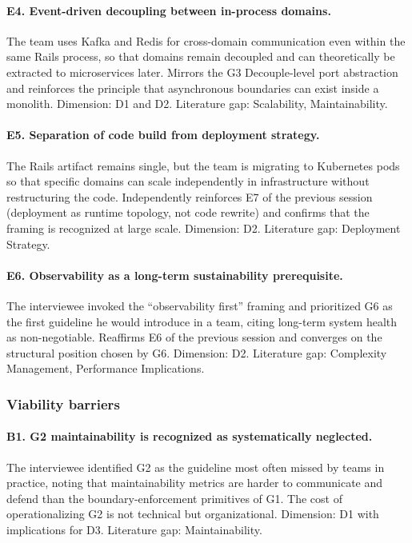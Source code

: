 \paragraph*{E4. Event-driven decoupling between in-process domains.} The team uses Kafka and Redis for cross-domain communication even within the same Rails process, so that domains remain decoupled and can theoretically be extracted to microservices later. Mirrors the G3 Decouple-level port abstraction and reinforces the principle that asynchronous boundaries can exist inside a monolith. Dimension: D1 and D2. Literature gap: Scalability, Maintainability.

\paragraph*{E5. Separation of code build from deployment strategy.} The Rails artifact remains single, but the team is migrating to Kubernetes pods so that specific domains can scale independently in infrastructure without restructuring the code. Independently reinforces E7 of the previous session (deployment as runtime topology, not code rewrite) and confirms that the framing is recognized at large scale. Dimension: D2. Literature gap: Deployment Strategy.

\paragraph*{E6. Observability as a long-term sustainability prerequisite.} The interviewee invoked the ``observability first'' framing and prioritized G6 as the first guideline he would introduce in a team, citing long-term system health as non-negotiable. Reaffirms E6 of the previous session and converges on the structural position chosen by G6. Dimension: D2. Literature gap: Complexity Management, Performance Implications.

\subsubsection*{Viability barriers}

\paragraph*{B1. G2 maintainability is recognized as systematically neglected.} The interviewee identified G2 as the guideline most often missed by teams in practice, noting that maintainability metrics are harder to communicate and defend than the boundary-enforcement primitives of G1. The cost of operationalizing G2 is not technical but organizational. Dimension: D1 with implications for D3. Literature gap: Maintainability.

